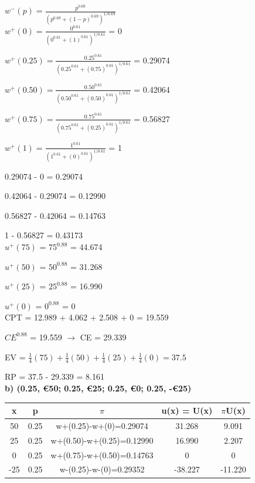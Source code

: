 \documentclass{article}
\begin{document}
$w^-(p) = \frac{p^{0.69}}{(p^{0.69}+(1-p)^{0.69})^{1/0.69}}$ \\ 


$w^+(0) = \frac{0^{0.61}}{(0^{0.61}+(1)^{0.61})^{1/0.61}}$ = 0

$w^+(0.25) = \frac{0.25^{0.61}}{(0.25^{0.61}+(0.75)^{0.61})^{1/0.61}}$ = 0.29074

$w^+(0.50) = \frac{0.50^{0.61}}{(0.50^{0.61}+(0.50)^{0.61})^{1/0.61}}$ = 0.42064

$w^+(0.75) = \frac{0.75^{0.61}}{(0.75^{0.61}+(0.25)^{0.61})^{1/0.61}}$ = 0.56827

$w^+(1) = \frac{1^{0.61}}{(1^{0.61}+(0)^{0.61})^{1/0.61}}$ = 1 \\ 

\normalsize

0.29074 - 0 = 0.29074

0.42064 - 0.29074 = 0.12990

0.56827 - 0.42064 = 0.14763

1 - 0.56827 = 0.43173 \\

$u^+(75)$ = $75^{0.88}$ = 44.674

$u^+(50)$ = $50^{0.88}$ = 31.268

$u^+(25)$ = $25^{0.88}$ = 16.990

$u^+(0)$ = $0^{0.88}$ = 0 \\

CPT = 12.989 + 4.062 + 2.508 + 0 = 19.559

$CE^{0.88}$ = 19.559 $\rightarrow$ CE = 29.339

\vspace{1.5mm}

EV = $\frac{1}{4}(75)+\frac{1}{4}(50)+\frac{1}{4}(25)+\frac{1}{4}(0)=37.5$

RP = 37.5 - 29.339 = 8.161 \\ 

\textbf{ b) (0.25, €50; 0.25, €25; 0.25, €0; 0.25, -€25)} 

 \vspace{2mm}
 
 \begin{tabular}{|c|c|c|c|c|}
 	\hline
 	x  & p    & $\pi$                         & u(x) = U(x) & $\pi$U(x)  \\ \hline
 	50 & 0.25 & w+(0.25)-w+(0)=0.29074    & 31.268      & 9.091 \\ \hline
 	25 & 0.25 & w+(0.50)-w+(0.25)=0.12990 & 16.990     & 2.207  \\ \hline
 	0 & 0.25 & w+(0.75)-w+(0.50)=0.14763 & 0      & 0  \\ \hline
 	-25  & 0.25 & w-(0.25)-w-(0)=0.29352    & -38.227           & -11.220      \\ \hline
 \end{tabular} \\ \\ 
\end{document}
